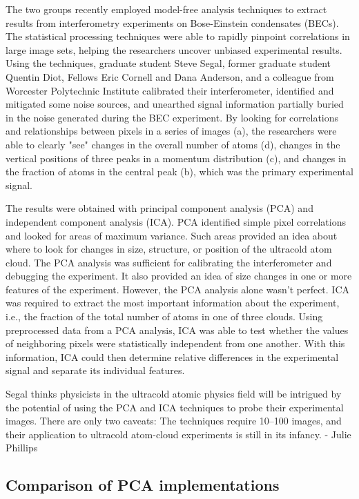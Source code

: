 The two groups recently employed model-free analysis techniques to extract results from interferometry experiments on Bose-Einstein condensates (BECs). The statistical processing techniques were able to rapidly pinpoint correlations in large image sets, helping the researchers uncover unbiased experimental results. Using the techniques, graduate student Steve Segal, former graduate student Quentin Diot, Fellows Eric Cornell and Dana Anderson, and a colleague from Worcester Polytechnic Institute calibrated their interferometer, identified and mitigated some noise sources, and unearthed signal information partially buried in the noise generated during the BEC experiment. By looking for correlations and relationships between pixels in a series of images (a), the researchers were able to clearly "see" changes in the overall number of atoms (d), changes in the vertical positions of three peaks in a momentum distribution (c), and changes in the fraction of atoms in the central peak (b), which was the primary experimental signal.

The results were obtained with principal component analysis (PCA) and independent component analysis (ICA). PCA identified simple pixel correlations and looked for areas of maximum variance. Such areas provided an idea about where to look for changes in size, structure, or position of the ultracold atom cloud. The PCA analysis was sufficient for calibrating the interferometer and debugging the experiment. It also provided an idea of size changes in one or more features of the experiment. However, the PCA analysis alone wasn’t perfect. ICA was required to extract the most important information about the experiment, i.e., the fraction of the total number of atoms in one of three clouds. Using preprocessed data from a PCA analysis, ICA was able to test whether the values of neighboring pixels were statistically independent from one another. With this information, ICA could then determine relative differences in the experimental signal and separate its individual features.

Segal thinks physicists in the ultracold atomic physics field will be intrigued by the potential of using the PCA and ICA techniques to probe their experimental images. There are only two caveats: The techniques require 10–100 images, and their application to ultracold atom-cloud experiments is still in its infancy.   - Julie Phillips

\subsection{Comparison of PCA implementations}

